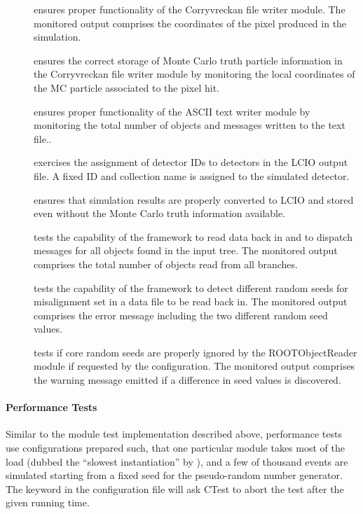 \begin{description}
    \item[] ensures proper functionality of the Corryvreckan file writer module. The monitored output comprises the coordinates of the pixel produced in the simulation.
    \item[] ensures the correct storage of Monte Carlo truth particle information in the Corryvreckan file writer module by monitoring the local coordinates of the MC particle associated to the pixel hit.
    \item[] ensures proper functionality of the ASCII text writer module by monitoring the total number of objects and messages written to the text file..
    \item[] exercises the assignment of detector IDs to \apsq detectors in the LCIO output file. A fixed ID and collection name is assigned to the simulated detector.
    \item[] ensures that simulation results are properly converted to LCIO and stored even without the Monte Carlo truth information available.
    \item[] tests the capability of the framework to read data back in and to dispatch messages for all objects found in the input tree. The monitored output comprises the total number of objects read from all branches.
    \item[] tests the capability of the framework to detect different random seeds for misalignment set in a data file to be read back in. The monitored output comprises the error message including the two different random seed values.
    \item[] tests if core random seeds are properly ignored by the ROOTObjectReader module if requested by the configuration. The monitored output comprises the warning message emitted if a difference in seed values is discovered.
\end{description}

\paragraph{Performance Tests}

Similar to the module test implementation described above, performance tests use configurations prepared such, that one particular module takes most of the load (dubbed the ``slowest instantiation'' by \apsq), and a few of thousand events are simulated starting from a fixed seed for the pseudo-random number generator.
The  keyword in the configuration file will ask CTest to abort the test after the given running time.

